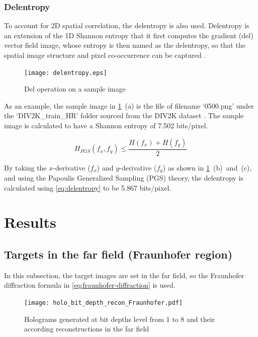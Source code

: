 \subsubsection{Delentropy} \label{sec:Delentropy}
	To account for 2D spatial correlation, the delentropy \cite{Larkin2016} is also used. Delentropy is an extension of the 1D Shannon entropy that it first computes the gradient (del) vector field image, whose entropy is then named as the delentropy, so that the spatial image structure and pixel co-occurrence can be captured \cite{Larkin2016}.

	\begin{figure} [H]
	   \begin{center}
	   \texttt{[image: delentropy.eps]}
	   \end{center}
	   \caption{\label{fig:delentropy} Del operation on a sample image}
	\end{figure}

	As an example, the sample image in \cref{fig:delentropy}~(a) is the file of filename `0500.png' under the `DIV2K\_train\_HR' folder sourced from the DIV2K dataset \cite{Agustsson2017}. The sample image is calculated to have a Shannon entropy of 7.502 bits/pixel.

	\begin{equation}
		H_{PGS}(f_x, f_y) \leq \frac{H(f_x) + H(f_y)}{2}
		\label{eq:delentropy}
	\end{equation}

	By taking the $x$-derivative ($f_x$) and $y$-derivative ($f_y$) as shown in \cref{fig:delentropy}~(b)~and~(c), and using the Papoulis Generalized Sampling (PGS) \cite{Papoulis1977} theory, the delentropy is calculated using \cref{eq:delentropy}\cite{Larkin2016} to be 5.867 bits/pixel.




\section{Results}
\subsection{Targets in the far field (Fraunhofer region)} \label{sec:Fraunhofer_results}
	In this subsection, the target images are set in the far field, so the Fraunhofer diffraction formula in \cref{eq:fraunhofer-diffraction} is used.

	\begin{figure} [H]
	   \begin{center}
	   \texttt{[image: holo\_bit\_depth\_recon\_Fraunhofer.pdf]}
	   \end{center}
	   \caption{\label{fig:holo_bit_depth_recon_Fraunhofer} Holograms generated at bit depths level from 1 to 8 and their according reconstructions in the far field}
	\end{figure}

